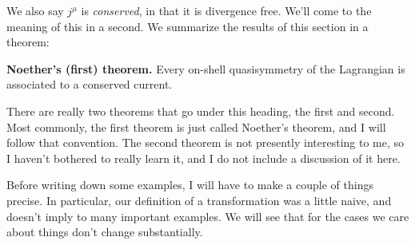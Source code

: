 \documentclass[main.tex]{subfiles}
\begin{document}
We also say $j^\mu$ is \textit{conserved}, in that it is divergence free. We'll come to the meaning of this in a second. We summarize the results of this section in a theorem:
\begin{thm} \label{thm:noether} \textbf{Noether's (first) theorem.}
Every on-shell quasisymmetry of the Lagrangian is associated to a conserved current.
\end{thm}
There are really two theorems that go under this heading, the first and second. Most commonly, the first theorem is just called Noether's theorem, and I will follow that convention. The second theorem is not presently interesting to me, so I haven't bothered to really learn it, and I do not include a discussion of it here.

Before writing down some examples, I will have to make a couple of things precise. In particular, our definition of a transformation was a little naive, and doesn't imply to many important examples. We will see that for the cases we care about things don't change substantially.
\end{document}
